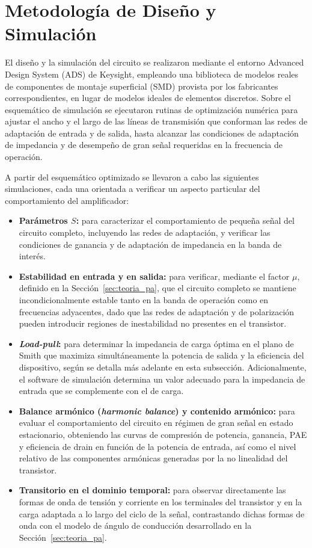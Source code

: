 \section{Metodología de Diseño y Simulación}
El diseño y la simulación del circuito se realizaron mediante el entorno Advanced Design System (ADS) de Keysight, empleando una biblioteca de modelos reales de componentes de montaje superficial (SMD) provista por los fabricantes correspondientes, en lugar de modelos ideales de elementos discretos. Sobre el esquemático de simulación se ejecutaron rutinas de optimización numérica para ajustar el ancho y el largo de las líneas de transmisión que conforman las redes de adaptación de entrada y de salida, hasta alcanzar las condiciones de adaptación de impedancia y de desempeño de gran señal requeridas en la frecuencia de operación.

A partir del esquemático optimizado se llevaron a cabo las siguientes simulaciones, cada una orientada a verificar un aspecto particular del comportamiento del amplificador:

\begin{itemize}
    \item \textbf{Parámetros $S$:} para caracterizar el comportamiento de pequeña señal del circuito completo, incluyendo las redes de adaptación, y verificar las condiciones de ganancia y de adaptación de impedancia en la banda de interés.
    \item \textbf{Estabilidad en entrada y en salida:} para verificar, mediante el factor $\mu$, definido en la Sección~\ref{sec:teoria_pa}, que el circuito completo se mantiene incondicionalmente estable tanto en la banda de operación como en frecuencias adyacentes, dado que las redes de adaptación y de polarización pueden introducir regiones de inestabilidad no presentes en el transistor.
    \item \textbf{\textit{Load-pull}:} para determinar la impedancia de carga óptima en el plano de Smith que maximiza simultáneamente la potencia de salida y la eficiencia del dispositivo, según se detalla más adelante en esta subsección. Adicionalmente, el software de simulación determina un valor adecuado para la impedancia de entrada que se complemente con el de carga.
    \item \textbf{Balance armónico (\textit{harmonic balance}) y contenido armónico:} para evaluar el comportamiento del circuito en régimen de gran señal en estado estacionario, obteniendo las curvas de compresión de potencia, ganancia, PAE y eficiencia de drain en función de la potencia de entrada, así como el nivel relativo de las componentes armónicas generadas por la no linealidad del transistor.
    \item \textbf{Transitorio en el dominio temporal:} para observar directamente las formas de onda de tensión y corriente en los terminales del transistor y en la carga adaptada a lo largo del ciclo de la señal, contrastando dichas formas de onda con el modelo de ángulo de conducción desarrollado en la Sección~\ref{sec:teoria_pa}.
\end{itemize}

